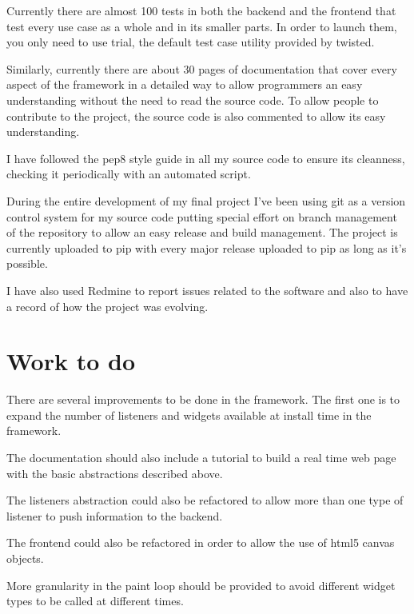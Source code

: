 \documentclass[12pt]{article}
\begin{document}
        Currently there are almost 100 tests in both the backend and the
        frontend that test every use case as a whole and in its smaller parts.
        In order to launch them, you only need to use trial, the default test
        case utility provided by twisted.

        Similarly, currently there are about 30 pages of documentation that
        cover every aspect of the framework in a detailed way to allow
        programmers an easy understanding without the need to read the source
        code. To allow people to contribute to the project, the source code is
        also commented to allow its easy understanding.

        I have followed the pep8 style guide in all my source code to ensure
        its cleanness, checking it periodically with an automated script.

        During the entire development of my final project I've been using git
        as a version control system for my source code putting special effort on
        branch management of the repository to allow an easy release and build
        management. The project is currently uploaded to pip with every major
        release uploaded to pip as long as it's possible.

        I have also used Redmine to report issues related to the software and
        also to have a record of how the project was evolving.

    \section{Work to do}
        There are several improvements to be done in the framework. The first
        one is to expand the number of listeners and widgets available at
        install time in the framework.

        The documentation should also include a tutorial to build a real time
        web page with the basic abstractions described above.

        The listeners abstraction could also be refactored to allow more than
        one type of listener to push information to the backend.

        The frontend could also be refactored in order to allow the use of html5
        canvas objects.

        More granularity in the paint loop should be provided to avoid different
        widget types to be called at different times.
\end{document}
